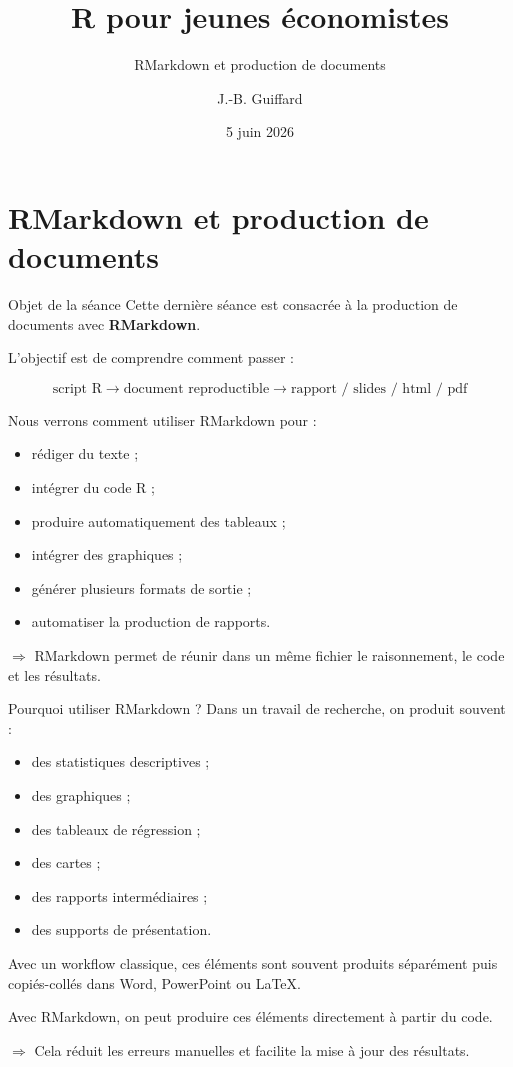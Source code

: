\documentclass[
  10pt,
  ignorenonframetext,
]{beamer}
\title{R pour jeunes économistes}
\subtitle{RMarkdown et production de documents}
\author{J.-B. Guiffard}
\date{5 juin 2026}
\providecommand{\tightlist}{%
  \setlength{\itemsep}{0pt}\setlength{\parskip}{0pt}}
\begin{document}
\frame{\titlepage}

\section{RMarkdown et production de
documents}\label{rmarkdown-et-production-de-documents}

\begin{frame}{Objet de la séance}
\label{objet-de-la-suxe9ance}
Cette dernière séance est consacrée à la production de documents avec
\textbf{RMarkdown}.

L'objectif est de comprendre comment passer :

\[
\text{script R} \rightarrow \text{document reproductible} \rightarrow \text{rapport / slides / html / pdf}
\]

Nous verrons comment utiliser RMarkdown pour :

\begin{itemize}
\tightlist
\item
  rédiger du texte ;
\item
  intégrer du code R ;
\item
  produire automatiquement des tableaux ;
\item
  intégrer des graphiques ;
\item
  générer plusieurs formats de sortie ;
\item
  automatiser la production de rapports.
\end{itemize}

\(\Rightarrow\) RMarkdown permet de réunir dans un même fichier le
raisonnement, le code et les résultats.
\end{frame}

\begin{frame}{Pourquoi utiliser RMarkdown ?}
\label{pourquoi-utiliser-rmarkdown}
Dans un travail de recherche, on produit souvent :

\begin{itemize}
\tightlist
\item
  des statistiques descriptives ;
\item
  des graphiques ;
\item
  des tableaux de régression ;
\item
  des cartes ;
\item
  des rapports intermédiaires ;
\item
  des supports de présentation.
\end{itemize}

Avec un workflow classique, ces éléments sont souvent produits
séparément puis copiés-collés dans Word, PowerPoint ou LaTeX.

Avec RMarkdown, on peut produire ces éléments directement à partir du
code.

\(\Rightarrow\) Cela réduit les erreurs manuelles et facilite la mise à
jour des résultats.
\end{frame}
\end{document}
